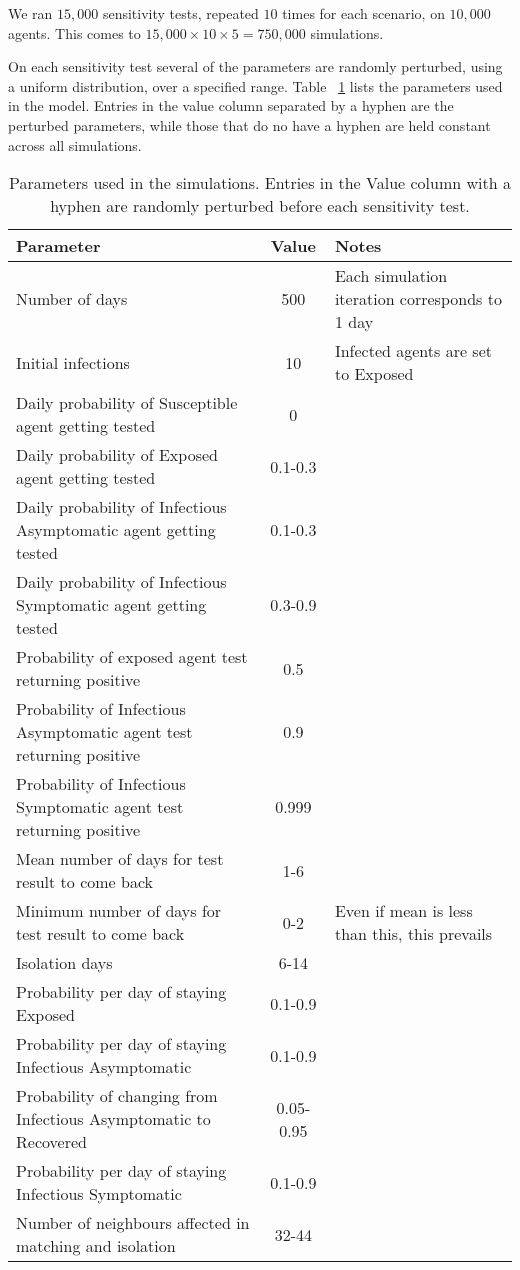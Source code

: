 \documentclass{article}
\begin{document}
We ran $15,000$ sensitivity tests, repeated $10$ times for each scenario, on
$10,000$ agents. This comes to $15,000 \times 10 \times 5 = 750,000$
simulations.

On each sensitivity test several of the parameters are randomly perturbed, using
a uniform distribution, over a specified range. Table ~\ref{table:parameters}
lists the parameters used in the model. Entries in the value column separated by
a hyphen are the perturbed parameters, while those that do no have a hyphen are
held constant across all simulations.

\begin{table}[h!]
\begin{tabular}{|p{7cm}|c|p{7cm}|}
  \hline
Parameter	&Value	&Notes\\ \hline
Number of days	& 500	&Each simulation iteration corresponds to 1 day\\ \hline
Initial infections	& 10	&Infected agents are set to Exposed\\ \hline
Daily probability of Susceptible agent getting tested	& 0	&\\ \hline
Daily probability of Exposed agent getting tested 	& 0.1-0.3	&\\ \hline
Daily probability of Infectious Asymptomatic agent getting tested	&0.1-0.3	&\\ \hline
Daily probability of Infectious Symptomatic agent getting tested	& 0.3-0.9	&\\ \hline
Probability of exposed agent test returning positive	& 0.5	&\\ \hline
Probability of Infectious Asymptomatic agent test returning positive	& 0.9	&\\ \hline
Probability of Infectious Symptomatic agent test returning positive	& 0.999	&\\ \hline
Mean number of days for test result to come back	& 1-6	&\\ \hline
Minimum number of days for test result to come back	& 0-2	&Even if mean is less than this, this prevails\\ \hline
Isolation days	& 6-14	&\\ \hline
Probability per day of staying Exposed	& 0.1-0.9	&\\ \hline
Probability per day of staying Infectious Asymptomatic	& 0.1-0.9	&\\ \hline
Probability of changing from Infectious Asymptomatic to Recovered	& 0.05-0.95	&\\ \hline
Probability per day of staying Infectious Symptomatic	& 0.1-0.9	&\\ \hline
Number of neighbours affected in matching and isolation	& 32-44	&\\
\hline
\end{tabular}
\caption{Parameters used in the simulations. Entries in the Value column with a
  hyphen are randomly perturbed before each sensitivity test.}
\label{table:parameters}
\end{table}
\end{document}
